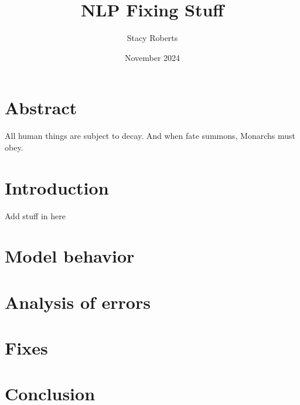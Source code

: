 \documentclass{article}
\title{NLP Fixing Stuff}
\author{Stacy Roberts}
\date{November 2024}
\begin{document}
\maketitle

\begin{multicols*}{2}

\section*{Abstract}
All human things are subject to decay. And when fate summons, Monarchs must obey.

\section*{Introduction}

Add stuff in here

\section*{Model behavior}

\section*{Analysis of errors}

\section*{Fixes}

\section*{Conclusion}

\end{multicols*}
\end{document}
